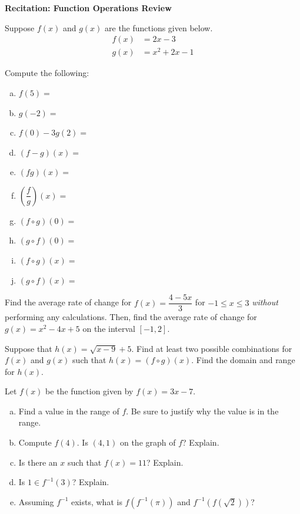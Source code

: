 \documentclass[11pt,letterpaper]{article}
\begin{document}

\phantom{} \hfill {\bfseries \Large Recitation: Function Operations Review} \hfill \phantom{} \par\vspace{0.5cm}

 Suppose $f(x)$ and $g(x)$ are the functions given below. 
	\[
	\begin{aligned}
	f(x)&= 2x - 3 \\[0.3cm]
	g(x)&= x^2 + 2x - 1
	\end{aligned}
	\]

Compute the following: \pspace
        \begin{enumerate}[(a)]
        \item $f(5)=$ \vfill
        \item $g(-2)=$ \vfill
        \item $f(0) - 3g(2)=$ \vfill
        \item $(f - g)(x)=$ \vfill
        \item $(fg)(x)=$ \vfill
        \item $\left( \dfrac{f}{g} \right)(x)=$ \vfill
        \item $(f \circ g)(0)=$ \vfill
        \item $(g \circ f)(0)=$ \vfill
        \item $(f \circ g)(x)=$ \vfill
        \item $(g \circ f)(x)=$ \vfill
        \end{enumerate} 



\newpage



 Find the average rate of change for $f(x)= \dfrac{4 - 5x}{3}$ for $-1 \leq x \leq 3$ \textit{without} performing any calculations. Then, find the average rate of change for $g(x)= x^2 - 4x + 5$ on the interval $[-1, 2]$. \vfill




 Suppose that $h(x)= \sqrt{x - 9} + 5$. Find at least two possible combinations for $f(x)$ and $g(x)$ such that $h(x)= (f \circ g)(x)$. Find the domain and range for $h(x)$. \vfill



\newpage



 Let $f(x)$ be the function given by $f(x)= 3x - 7$. 
	\begin{enumerate}[(a)]
	\item Find a value in the range of $f$. Be sure to justify why the value is in the range. \vfill
	\item Compute $f(4)$. Is $(4, 1)$ on the graph of $f$? Explain. \vfill
	\item Is there an $x$ such that $f(x)= 11$? Explain. \vfill
	\item Is $1 \in f^{-1}(3)$? Explain. \vfill
	\item Assuming $f^{-1}$ exists, what is $f(f^{-1}(\pi))$ and $f^{-1}(f(\sqrt{2}))$? \vfill
	\end{enumerate}
\end{document}
